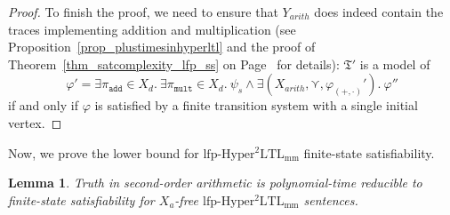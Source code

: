 \documentclass[dvipsnames,10pt,a4paper]{amsart}
\newtheorem{lem}[thm]{Lemma}
\theoremstyle{definition}
\theoremstyle{remark}
\renewcommand{\phi}{\varphi}
\newcommand{\lfpsohyltlfp}{\mathrm{lfp\text{-}{Hyper^2LTL_{\mathrm{mm}}}}\xspace}
\newcommand{\univar}{X_a}
\newcommand{\unidisvar}{X_d}
\newcommand{\smallest}{\curlyvee}
\newcommand{\tsys}{\mathfrak{T}}
\newcommand{\add}{\texttt{add}}
\newcommand{\mult}{\texttt{mult}}
\newcommand{\plustimes}{{(+,\cdot)}}
\newcommand{\arith}{\mathit{arith}}
\begin{document}
\begin{proof}
To finish the proof, we need to ensure that $Y_\arith$ does indeed contain the traces implementing addition and multiplication (see Proposition~\ref{prop_plustimesinhyperltl} and the proof of Theorem~\ref{thm_satcomplexity_lfp_ss} on Page~\pageref{pageref_plustimesaslfp} for details): $\tsys'$ is a model of 
\[
\phi' = \exists \pi_\add \in \unidisvar.\ \exists \pi_\mult \in \unidisvar.\ \psi_s \wedge \exists(X_\arith, \smallest, \phi_\plustimes').\ \phi''
\]
if and only if $\phi$ is satisfied by a finite transition system with a single initial vertex.
\end{proof}

Now, we prove the lower bound for $\lfpsohyltlfp$ finite-state satisfiability.

\begin{lem}
\label{lemma_fssat_soahard}
Truth in second-order arithmetic is polynomial-time reducible to finite-state satisfiability for $\univar$-free $\lfpsohyltlfp$ sentences.
\end{lem}
\end{document}
